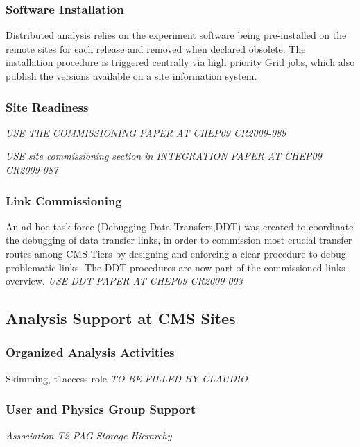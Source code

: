 \subsubsection{ Software Installation }
\label{sec:4_1_1}
Distributed analysis relies on the experiment software being pre-installed on the remote
sites for each release and removed when declared obsolete. 
The installation procedure is triggered centrally via high priority Grid jobs, which also 
publish the versions available on a site information system.

\label{sec:4_1_2}
\subsubsection{ Site Readiness }
\label{sec:4_1_3} 
\emph{USE THE COMMISSIONING PAPER AT CHEP09 CR2009-089}

\emph{USE site commissioning section in INTEGRATION PAPER AT CHEP09 CR2009-087}

\subsubsection{ Link Commissioning }
An ad-hoc task force (Debugging Data Transfers,DDT)\cite{RefDDT} was created to coordinate the debugging of data transfer links, in order to commission most crucial transfer routes among CMS Tiers by designing and enforcing a clear procedure to debug problematic links. The DDT procedures are now part of the commissioned links overview.
\emph{USE DDT PAPER AT CHEP09 CR2009-093}


\label{sec:4_1_4}
\subsection{Analysis Support at CMS Sites}
\label{sec:4_2}
\subsubsection{ Organized Analysis Activities }
\label{sec:4_2_1}
Skimming, t1access role 
\emph{TO BE FILLED BY CLAUDIO}

\subsubsection{ User and Physics Group Support }
\label{sec:4_2_2}
\emph{ Association T2-PAG
Storage Hierarchy}

